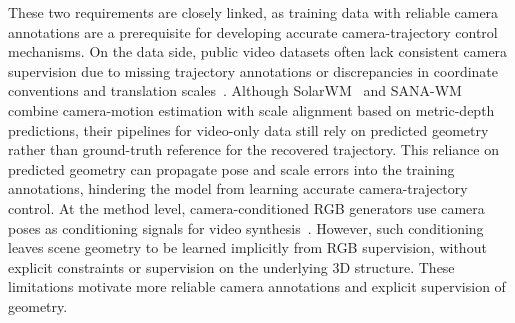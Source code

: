 These two requirements are closely linked, as training data with reliable camera annotations are a prerequisite for developing accurate camera-trajectory control mechanisms.
%
On the data side, public video datasets often lack consistent camera supervision due to missing trajectory annotations or discrepancies in coordinate conventions and translation scales~\cite{ju2024miradatalargescalevideodataset,zheng2025realcamvidhighresolutionvideodataset}.
%
Although SolarWM~\cite{huang2026solarwmopendatascalable} and SANA-WM~\cite{zhu2026sanawmefficientminutescaleworld} combine camera-motion estimation with scale alignment based on metric-depth predictions, their pipelines for video-only data still rely on predicted geometry rather than ground-truth reference for the recovered trajectory.
%
This reliance on predicted geometry can propagate pose and scale errors into the training annotations, hindering the model from learning accurate camera-trajectory control.
%
At the method level, camera-conditioned RGB generators use camera poses as conditioning signals for video synthesis~\cite{he2025cameractrlenablingcameracontrol,huang2026solarwmopendatascalable,zhu2026sanawmefficientminutescaleworld}.
%
However, such conditioning leaves scene geometry to be learned implicitly from RGB supervision, without explicit constraints or supervision on the underlying 3D structure.
%
These limitations motivate more reliable camera annotations and explicit supervision of geometry.

